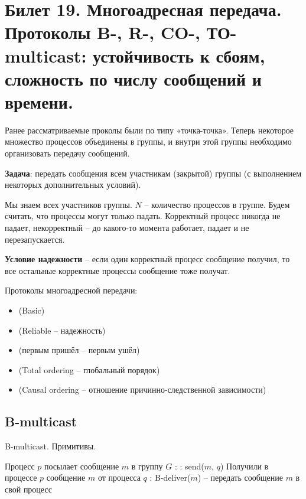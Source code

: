 \newpage
\section{Билет 19. Многоадресная передача. Протоколы B-, R-, CO-, ТО-multicast: устойчивость к сбоям, сложность по числу сообщений и времени.}

Ранее рассматриваемые проколы были по типу «точка-точка».
Теперь некоторое множество процессов объединены в группы, и внутри этой группы необходимо организовать передачу сообщений.

\textbf{Задача}: передать сообщения всем участникам (закрытой) группы (с выполнением некоторых дополнительных условий).

Мы знаем всех участников группы. $N$ -- количество процессов в группе. Будем считать, что процессы могут только падать.
Корректный процесс никогда не падает, некорректный -- до какого-то момента работает, падает и не перезапускается.

\textbf{Условие надежности} -- если один корректный процесс сообщение получил, то все остальные корректные процессы сообщение тоже получат.
\bigskip

Протоколы многоадресной передачи:
\begin{itemize}
	\item {} (Basic) %
	\item {} (Reliable -- надежность) %
	\item {} (первым пришёл -- первым ушёл) %
	\item {} (Total ordering -- глобальный порядок) %
	\item {} (Causal ordering -- отношение причинно-следственной зависимости) %
\end{itemize}

\newpage
\subsection*{B-multicast}\label{b19:part1}

\begin{algorithm}[h!]
\caption{B-multicast. Примитивы.}
\begin{algorithmic}

\State Процесс $p$ посылает сообщение $m$ в группу $G$
:
	:
		\State send($m$, $q$)
	\EndFor
\EndProcedure
\State
\State Получили в процессе $p$ сообщение $m$ от процесса $q$
:
	\State B-deliver($m$) -- передать сообщение $m$ в свой процесс
\EndProcedure

\end{algorithmic}
\end{algorithm}

